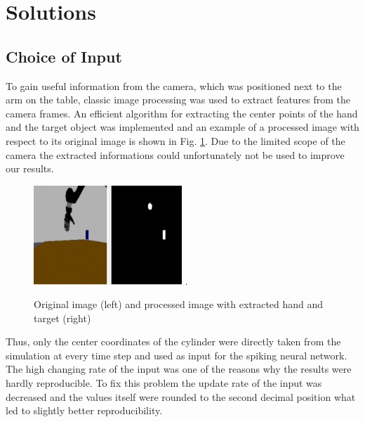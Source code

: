 \section{Solutions}
\subsection{Choice of Input}
To gain useful information from the camera, which was positioned next to the arm on the table, classic image processing was used to extract features from the camera frames. An efficient algorithm for extracting the center points of the hand and the target object was implemented and an example of a processed image with respect to its original image is shown in Fig. \ref{fig:processed_pic}. Due to the limited scope of the camera the extracted informations could unfortunately not be used to improve our results.\\


\begin{figure}[H]
	\centering
	\includegraphics[width=2.2in]{img/image_processing.png}
	\DeclareGraphicsExtensions.
	\caption{Original image (left) and processed image with extracted hand and target (right)}
	\label{fig:processed_pic}
\end{figure}
Thus, only the center coordinates of the cylinder were directly taken from the simulation at every time step and used as input for the spiking neural network.
The high changing rate of the input was one of the reasons why the results were hardly reproducible. 
To fix this problem the update rate of the input was decreased and the values itself were rounded to the second decimal position what led to slightly better reproducibility. 

